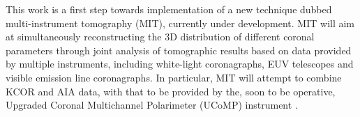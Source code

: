 \documentclass[baaa]{baaa}
\begin{document}
This work is a first step towards implementation of a new technique dubbed multi-instrument tomography (MIT), currently under development. MIT will aim at simultaneously reconstructing the 3D distribution of different coronal parameters through joint analysis of tomographic results based on data provided by multiple instruments, including white-light coronagraphs, EUV telescopes and visible emission line coronagraphs. In particular, MIT will attempt to combine KCOR and AIA data, with that to be provided by the, soon to be operative, Upgraded Coronal Multichannel Polarimeter (UCoMP) instrument \citep{landi_2016}.


\small

 
\end{document}
